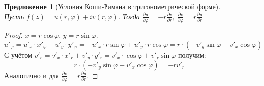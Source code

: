 \documentclass[11pt,openany,a4paper]{scrartcl}
\theoremstyle{plain}
\newtheorem{proposition}[theorem]{Предложение}
\theoremstyle{definition}
\newcommand{\pd}[2]{\frac{\partial #1}{\partial #2}}
\begin{document}
\begin{proposition}[Условия Коши-Римана в тригонометрической форме]
\mbox{}\\
	Пусть $f(z) = u(r, \varphi) + iv(r, \varphi)$. Тогда $\pd{u}{\varphi} = -r\pd{v}{r}$,
	$\pd{v}{\varphi} = r\pd{u}{r}$
\end{proposition}
\begin{proof}
	$x = r\cos \varphi$, $y = r\sin \varphi$.
	$$
	u'_\varphi = u'_x\cdot x'_\varphi + u'_y\cdot y'_\varphi = -u'_x \cdot r\sin \varphi +
	u'_y \cdot r\cos \varphi = r\cdot(-v'_y\sin \varphi - v'_x\cos \varphi)
	$$
	С учётом $v'_r = v'_x \cdot x'_r + v'_y \cdot y'_r = v'_x\cdot \cos \varphi + v'_y \sin \varphi$
	получим:
	$$
	r\cdot(-v'_y\sin \varphi - v'_x\cos \varphi) = -rv'_r
	$$
	Аналогично и для $\pd{v}{\varphi} = r\pd{u}{r}$.
\end{proof}
\end{document}
